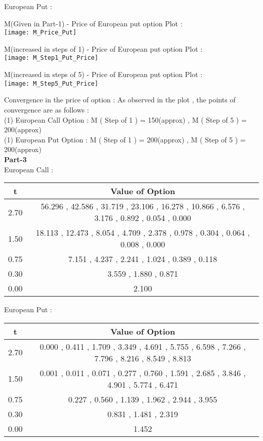 \documentclass{article}
\begin{document}
\newpage
European Put :
\begin{center}
M(Given in Part-1) - Price of European put option Plot :\\
\texttt{[image: M\_Price\_Put]}
\end{center}

\begin{center}
M(increased in steps of 1) - Price of European put option Plot :\\
\texttt{[image: M\_Step1\_Put\_Price]}
\end{center}

\begin{center}
M(increased in steps of 5) - Price of European put option Plot :\\
\texttt{[image: M\_Step5\_Put\_Price]}
\end{center}
Convergence in the price of option : As observed in the plot , the points of convergence are as follows :\\
(1) European Call Option :  M ( Step of 1 ) = 150(approx) ,  M ( Step of 5 ) = 200(approx) \\
(1) European Put Option :  M ( Step of 1 ) = 200(approx) ,  M ( Step of 5 ) = 200(approx) \\
\textbf{Part-3}\\
European Call :
\begin{center}
\begin{tabular}{ |c|c| } 
 \hline
 t & Value of Option \\
 \hline
2.70 & 56.296 , 42.586 , 31.719 , 23.106 , 16.278 , 10.866 , 6.576 , 3.176 , 0.892 , 0.054 , 0.000 \\
1.50 & 18.113 , 12.473 , 8.054 , 4.709 , 2.378 , 0.978 , 0.304 , 0.064 , 0.008 , 0.000  \\
0.75 & 7.151 , 4.237 , 2.241 , 1.024 , 0.389 , 0.118 \\
0.30 & 3.559 , 1.880 , 0.871 \\
0.00 & 2.100\\

 \hline
\end{tabular}
\end{center}

European Put :
\begin{center}
\begin{tabular}{ |c|c| } 
 \hline
 t & Value of Option \\
 \hline
2.70 & 0.000 , 0.411 , 1.709 , 3.349 , 4.691 , 5.755 , 6.598 , 7.266 , 7.796 , 8.216 , 8.549 , 8.813\\ 
1.50 & 0.001 , 0.011 , 0.071 , 0.277 , 0.760 , 1.591 , 2.685 , 3.846 , 4.901 , 5.774 , 6.471\\ 
0.75 & 0.227 , 0.560 , 1.139 , 1.962 , 2.944 , 3.955\\ 
0.30 & 0.831 , 1.481 , 2.319\\ 
0.00 & 1.452\\
 \hline
\end{tabular}
\end{center}
\end{document}

